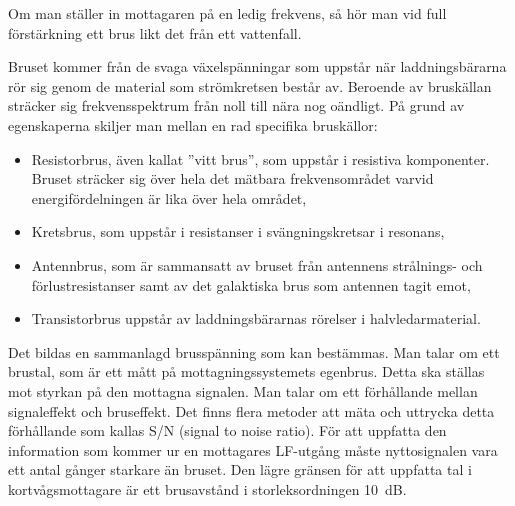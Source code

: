 Om man ställer in mottagaren på en ledig frekvens, så hör man vid full
förstärkning ett brus likt det från ett vattenfall.

Bruset kommer från de svaga växelspänningar som uppstår när
laddningsbärarna rör sig genom de material som strömkretsen består
av. Beroende av bruskällan sträcker sig frekvensspektrum från noll
till nära nog oändligt. På grund av egenskaperna skiljer man mellan en
rad specifika bruskällor:
\begin{itemize}
\item Resistorbrus, även kallat ''vitt brus'', som uppstår i resistiva
  komponenter. Bruset sträcker sig över hela det mätbara
  frekvensområdet varvid energifördelningen är lika över hela området,

\item Kretsbrus, som uppstår i resistanser i svängningskretsar i
  resonans,

\item Antennbrus, som är sammansatt av bruset från antennens
  strålnings- och förlustresistanser samt av det galaktiska brus som
  antennen tagit emot,

\item Transistorbrus uppstår av laddningsbärarnas rörelser i
  halvledarmaterial.
\end{itemize}

Det bildas en sammanlagd brusspänning som kan bestämmas. Man talar om
ett brustal, som är ett mått på mottagningssystemets egenbrus. Detta
ska ställas mot styrkan på den mottagna signalen. Man talar om ett
förhållande mellan signaleffekt och bruseffekt. Det finns flera
metoder att mäta och uttrycka detta förhållande som kallas S/N (signal
to noise ratio). För att uppfatta den information som kommer ur en
mottagares LF-utgång måste nyttosignalen vara ett antal gånger
starkare än bruset. Den lägre gränsen för att uppfatta tal i
kortvågsmottagare är ett brusavstånd i storleksordningen 10~dB.

